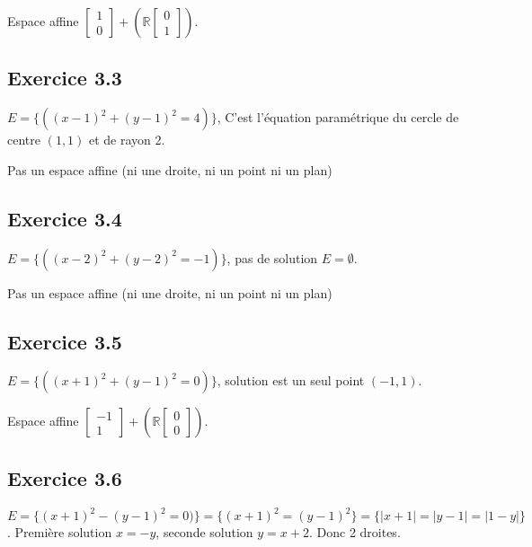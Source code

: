 \documentclass[]{book}
\theoremstyle{definition}
\newcommand{\bb}[1]{\mathbb{#1}}
\newcommand{\R}{\bb{R}}
\begin{document}
Espace affine $\begin{bmatrix} 1 \\ 0 \end{bmatrix} + (\R \begin{bmatrix} 0 \\ 1 \end{bmatrix})$.

\subsection*{Exercice 3.3}
$E= \{ ((x-1)^2 + (y-1)^2 = 4)\}$, C'est l'\'equation param\'etrique du cercle de centre $(1,1)$ et de rayon 2.


Pas un espace affine (ni une droite, ni un point ni un plan)

\subsection*{Exercice 3.4}
$E= \{ ((x-2)^2 + (y-2)^2 = -1)\}$, pas de solution $E = \emptyset$.

Pas un espace affine (ni une droite, ni un point ni un plan)

\subsection*{Exercice 3.5}
$E= \{ ((x+1)^2 + (y-1)^2 = 0)\}$, solution est un seul point $(-1,1)$.

Espace affine $\begin{bmatrix} -1 \\ 1 \end{bmatrix} + (\R \begin{bmatrix} 0 \\ 0 \end{bmatrix})$.

\subsection*{Exercice 3.6}
$E= \{ (x+1)^2 - (y-1)^2 = 0)\} = \{ (x+1)^2 = (y-1)^2\} = \{ |x+1| = |y-1| = |1-y|\}$. Premi\`ere solution $x=-y$, seconde solution $y = x+2$. Donc 2 droites.
\end{document}
